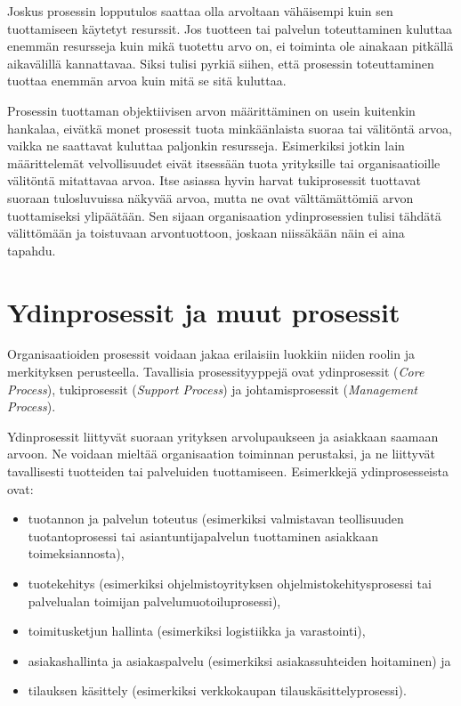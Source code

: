 \documentclass[
  finnish,
  letterpaper,
  DIV=11,
  numbers=noendperiod,
  oneside]{scrreprt}
\providecommand{\tightlist}{%
  \setlength{\itemsep}{0pt}\setlength{\parskip}{0pt}}
\begin{document}
Joskus prosessin lopputulos saattaa olla arvoltaan vähäisempi kuin sen
tuottamiseen käytetyt resurssit. Jos tuotteen tai palvelun toteuttaminen
kuluttaa enemmän resursseja kuin mikä tuotettu arvo on, ei toiminta ole
ainakaan pitkällä aikavälillä kannattavaa. Siksi tulisi pyrkiä siihen,
että prosessin toteuttaminen tuottaa enemmän arvoa kuin mitä se sitä
kuluttaa.

Prosessin tuottaman objektiivisen arvon määrittäminen on usein kuitenkin
hankalaa, eivätkä monet prosessit tuota minkäänlaista suoraa tai
välitöntä arvoa, vaikka ne saattavat kuluttaa paljonkin resursseja.
Esimerkiksi jotkin lain määrittelemät velvollisuudet eivät itsessään
tuota yrityksille tai organisaatioille välitöntä mitattavaa arvoa. Itse
asiassa hyvin harvat tukiprosessit tuottavat suoraan tulosluvuissa
näkyvää arvoa, mutta ne ovat välttämättömiä arvon tuottamiseksi
ylipäätään. Sen sijaan organisaation ydinprosessien tulisi tähdätä
välittömään ja toistuvaan arvontuottoon, joskaan niissäkään näin ei aina
tapahdu.

\section{Ydinprosessit ja muut
prosessit}\label{ydinprosessit-ja-muut-prosessit}

Organisaatioiden prosessit voidaan jakaa erilaisiin luokkiin niiden
roolin ja merkityksen perusteella. Tavallisia prosessityyppejä ovat
ydinprosessit (\emph{Core Process}), tukiprosessit (\emph{Support
Process}) ja johtamisprosessit (\emph{Management Process}).

Ydinprosessit liittyvät suoraan yrityksen arvolupaukseen ja asiakkaan
saamaan arvoon. Ne voidaan mieltää organisaation toiminnan perustaksi,
ja ne liittyvät tavallisesti tuotteiden tai palveluiden tuottamiseen.
Esimerkkejä ydinprosesseista ovat:

\begin{itemize}
\tightlist
\item
  tuotannon ja palvelun toteutus (esimerkiksi valmistavan teollisuuden
  tuotantoprosessi tai asiantuntijapalvelun tuottaminen asiakkaan
  toimeksiannosta),
\item
  tuotekehitys (esimerkiksi ohjelmistoyrityksen
  ohjelmistokehitysprosessi tai palvelualan toimijan
  palvelumuotoiluprosessi),
\item
  toimitusketjun hallinta (esimerkiksi logistiikka ja varastointi),
\item
  asiakashallinta ja asiakaspalvelu (esimerkiksi asiakassuhteiden
  hoitaminen) ja
\item
  tilauksen käsittely (esimerkiksi verkkokaupan
  tilauskäsittelyprosessi).
\end{itemize}
\end{document}
